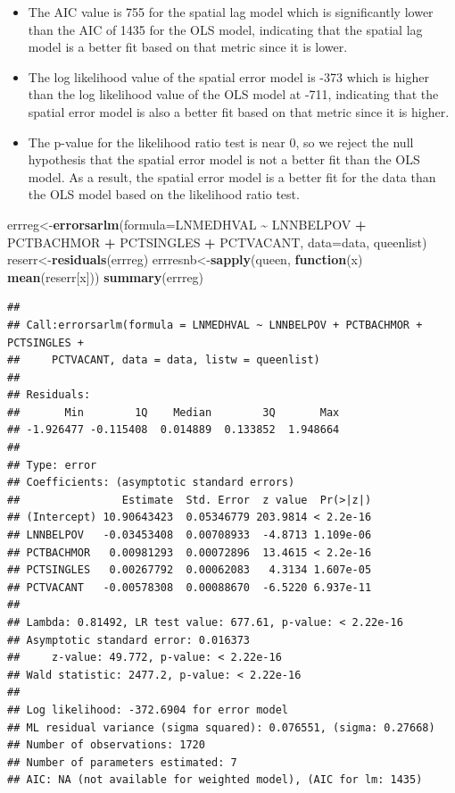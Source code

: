 \documentclass[
]{article}
\newenvironment{Shaded}{\begin{snugshade}}{\end{snugshade}}
\newcommand{\AttributeTok}[1]{\textcolor[rgb]{0.13,0.29,0.53}{#1}}
\newcommand{\ControlFlowTok}[1]{\textcolor[rgb]{0.13,0.29,0.53}{\textbf{#1}}}
\newcommand{\FunctionTok}[1]{\textcolor[rgb]{0.13,0.29,0.53}{\textbf{#1}}}
\newcommand{\NormalTok}[1]{#1}
\newcommand{\OtherTok}[1]{\textcolor[rgb]{0.56,0.35,0.01}{#1}}
\newcommand{\SpecialCharTok}[1]{\textcolor[rgb]{0.81,0.36,0.00}{\textbf{#1}}}
\providecommand{\tightlist}{%
  \setlength{\itemsep}{0pt}\setlength{\parskip}{0pt}}
\begin{document}
\begin{itemize}
\tightlist
\item
  The AIC value is 755 for the spatial lag model which is significantly
  lower than the AIC of 1435 for the OLS model, indicating that the
  spatial lag model is a better fit based on that metric since it is
  lower.
\item
  The log likelihood value of the spatial error model is -373 which is
  higher than the log likelihood value of the OLS model at -711,
  indicating that the spatial error model is also a better fit based on
  that metric since it is higher.
\item
  The p-value for the likelihood ratio test is near 0, so we reject the
  null hypothesis that the spatial error model is not a better fit than
  the OLS model. As a result, the spatial error model is a better fit
  for the data than the OLS model based on the likelihood ratio test.
\end{itemize}

\begin{Shaded}
\begin{Highlighting}[]
\NormalTok{errreg}\OtherTok{\textless{}{-}}\FunctionTok{errorsarlm}\NormalTok{(}\AttributeTok{formula=}\NormalTok{LNMEDHVAL }\SpecialCharTok{\textasciitilde{}}\NormalTok{ LNNBELPOV }\SpecialCharTok{+}\NormalTok{ PCTBACHMOR }\SpecialCharTok{+}\NormalTok{ PCTSINGLES }\SpecialCharTok{+}\NormalTok{ PCTVACANT, }\AttributeTok{data=}\NormalTok{data, queenlist)}
\NormalTok{reserr}\OtherTok{\textless{}{-}}\FunctionTok{residuals}\NormalTok{(errreg)}
\NormalTok{errresnb}\OtherTok{\textless{}{-}}\FunctionTok{sapply}\NormalTok{(queen, }\ControlFlowTok{function}\NormalTok{(x) }\FunctionTok{mean}\NormalTok{(reserr[x]))}
\FunctionTok{summary}\NormalTok{(errreg)}
\end{Highlighting}
\end{Shaded}

\begin{verbatim}
## 
## Call:errorsarlm(formula = LNMEDHVAL ~ LNNBELPOV + PCTBACHMOR + PCTSINGLES + 
##     PCTVACANT, data = data, listw = queenlist)
## 
## Residuals:
##       Min        1Q    Median        3Q       Max 
## -1.926477 -0.115408  0.014889  0.133852  1.948664 
## 
## Type: error 
## Coefficients: (asymptotic standard errors) 
##                Estimate  Std. Error  z value  Pr(>|z|)
## (Intercept) 10.90643423  0.05346779 203.9814 < 2.2e-16
## LNNBELPOV   -0.03453408  0.00708933  -4.8713 1.109e-06
## PCTBACHMOR   0.00981293  0.00072896  13.4615 < 2.2e-16
## PCTSINGLES   0.00267792  0.00062083   4.3134 1.607e-05
## PCTVACANT   -0.00578308  0.00088670  -6.5220 6.937e-11
## 
## Lambda: 0.81492, LR test value: 677.61, p-value: < 2.22e-16
## Asymptotic standard error: 0.016373
##     z-value: 49.772, p-value: < 2.22e-16
## Wald statistic: 2477.2, p-value: < 2.22e-16
## 
## Log likelihood: -372.6904 for error model
## ML residual variance (sigma squared): 0.076551, (sigma: 0.27668)
## Number of observations: 1720 
## Number of parameters estimated: 7 
## AIC: NA (not available for weighted model), (AIC for lm: 1435)
\end{verbatim}
\end{document}
